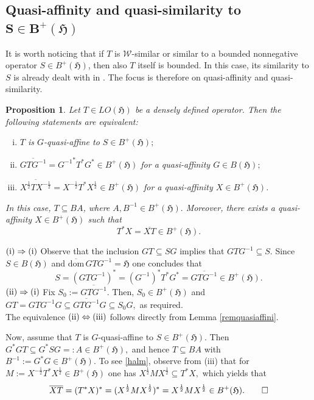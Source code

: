 \documentclass{amsart}
\makeatletter
\newtheorem{proposition}[theorem]{Proposition}
\newcommand{\ifaf}{\Leftrightarrow}
\newcommand{\h}{\mathfrak{H}}
\newcommand{\dombar}{\overline{\mathrm{dom}}\,}%
\newcommand{\adj}{^*}
\newcommand{\inv}{^{-1}}
\newcommand{\tstar}{T^{*}}
\newcommand{\half}{^{\frac{1}{2}}}
\newcommand{\mhalf}{^{-\frac{1}{2}}}
\newcommand{\inclu}{\subseteq}
\newcommand{\lplus}{B^{+}(\h)}
\numberwithin{equation}{section}
\renewenvironment{proof}[1][\proofname]{%
   \par\pushQED{\qed}\normalfont%
   \topsep6\p@\@plus6\p@\relax
   \trivlist\item[\hskip\labelsep\bfseries#1\@addpunct{.}]%
   \ignorespaces
}{%
   \popQED\endtrivlist\@endpefalse
}
\renewcommand{\labelenumi}{(\arabic{enumi})}
\makeatother
\begin{document}
\subsection{Quasi-affinity and quasi-similarity to   $\mathbf{S \in \lplus}$} \label{subseection43}

It is worth noticing  that if $T$ is $\mathcal{W}$-similar or similar to a bounded nonnegative  operator $S \in \lplus$, then also $T$ itself is bounded. In this case, its similarity to $S$ is already dealt with in  \cite[Theorem 3.1]{product2021}. The focus is therefore on quasi-affinity and quasi-similarity.

\begin{proposition}\label{ivaa}
  Let $T \in LO(\h)$ be a densely defined operator. Then  the following statements are equivalent:
\begin{enumerate}[(i)]\def\labelenumi{\rm(\roman{enumi})}
\item \textcolor[rgb]{0.00,0.00,0.00}{$T$ is $G$-quasi-affine to $S \in \lplus;$}
  \item  $\overline{GT G\inv}= {G\inv}\adj \tstar G\adj \in \lplus $ for a quasi-affinity $G \in B(\h);$
  \item $ \overline{ X\half T X\mhalf} = X\mhalf \tstar X\half \in \lplus$  for a quasi-affinity    $X  \in \lplus$.
\end{enumerate}
In this case, $T \inclu  B A$,    where $A, B\inv \in \lplus.$   Moreover, there exists a   quasi-affinity $X \in \lplus$  such that
        \begin{equation}\label{halm}
          \tstar X =  \overline{XT} \in \lplus .
        \end{equation}
\end{proposition}


\begin{proof}
$\rm{(i)}  \Rightarrow \rm{(i)}$ Observe that the inclusion $GT \inclu SG$ implies that $GTG\inv \inclu S.$ Since $S \in B(\h)$ and $\dombar GTG\inv  =\h$ one concludes that
\begin{equation}\label{44}
   S= (GTG\inv)\adj = ({G\inv})\adj \tstar G\adj = \overline{G T G\inv} \in \lplus.
\end{equation}
  $\rm{(ii)} \Rightarrow  \rm{(i)}$ Fix $S_0:=\overline{GT G\inv}.$ Then, $S_0 \in \lplus$ and $GT = G T G\inv G \inclu  \overline{G T G\inv} G  \inclu S_0G,$ as required. \\
      \hspace*{0.3cm}  The equivalence $\rm{(ii)} \ifaf  \rm{(iii)}$ follows directly from Lemma \ref{remquasiaffini}.

Now, assume that $T$ is $G$-quasi-affine to $S \in \lplus.$ Then $G\adj G T \inclu  G\adj SG =:A \in \lplus,$ and hence $ T \inclu B A$ with $B\inv:= G\adj G \in \lplus.$ To see \eqref{halm}, observe from \rm(iii) that for $M:= X\mhalf \tstar X\half \in \lplus$ one has
$X\half M X\half \inclu \tstar X,$ which yields that
\[
 \overline{XT }= (\tstar X)\adj = (X\half M X\half)\adj
                                       = X\half M X\half
                                       \in \lplus. \hfill \qedhere
\]
\end{proof}
\end{document}
